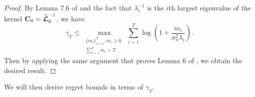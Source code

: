 \begin{proof}
	By Lemma 7.6 of \cite{srinivas2012information} and the fact that $\lambda_i^{-1}$ is the $i$th largest eigenvalue of the kernel ${\mathbf C}_0 = \widetilde{{\boldsymbol{\mathcal L}}}_0^{-1}$, we have 
	\begin{equation}
		\gamma_T \leq \max_{\substack{\{m_i\}_{i=1}^T, m_i \geq 0, \\ \sum_{i=1}^T m_i = T}} \sum_{i=1}^T \log\left( 1 + \frac{m_i}{\sigma_n^2 \lambda_i} \right).
		\label{eq:gamma_bound}
	\end{equation}
	Then by applying the same argument that proves Lemma 6 of \cite{valko2014spectral}, we obtain the desired result. 
\end{proof}
We will then derive regret bounds in terms of $\gamma_T$.

